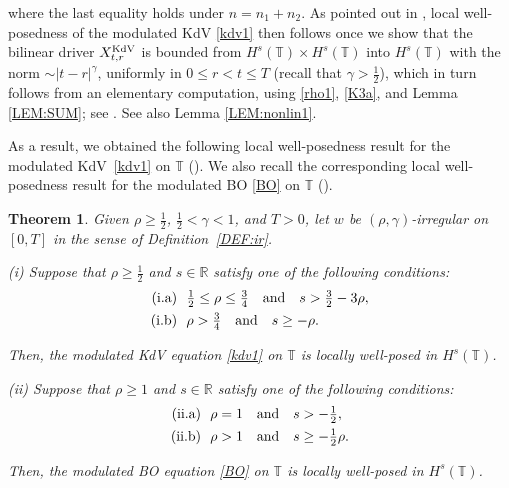 \documentclass[letterpaper, 11pt,  reqno]{amsart}
\newtheorem{oldtheorem}{Theorem}
\newcommand{\1}{\hspace{0.5mm}\text{I}\hspace{0.5mm}}
\newcommand{\noi}{\noindent}
\newcommand{\R}{\mathbb{R}}
\newcommand{\T}{\mathbb{T}}
\newcommand{\g}{\gamma}
\newcommand{\KDV}{\text{\rm KdV} }
\numberwithin{equation}{section}
\numberwithin{theorem}{section}
\begin{document}
\noi
where the last equality holds under  $n = n_1+ n_2$.
As pointed out in \cite[Section 3]{CGLLO1}, 
local well-posedness of the modulated KdV \eqref{kdv1}
then follows 
once we show that 
the bilinear driver $X^\KDV_{t, r}$ is 
bounded from $H^s(\T) \times
H^s(\T)$ into $H^s(\T)$
with the norm $\sim |t- r|^\g$, 
uniformly in  $0 \le r < t \le T$
(recall that $\g > \frac 12$), 
which in turn follows from 
an elementary computation, 
using \eqref{rho1}, \eqref{K3a}, 
and 
 Lemma \ref{LEM:SUM};
 see
 \cite[Proposition~4.1]{CGLLO1}.
See also Lemma \ref{LEM:nonlin1}.



As a result, we obtained
the following local well-posedness result
for  the modulated KdV~\eqref{kdv1} on $\T$
(\cite[Theorem 1.3\,(i)]{CGLLO1}). 
We also recall the corresponding 
local well-posedness result
for the modulated BO \eqref{BO} on $\T$
(\cite[Theorem 1.11\,(i)]{CGLLO1}). 



\begin{oldtheorem}\label{THM:1}
Given $\rho \ge\frac 12$,  $\frac12< \g < 1$, and $T> 0$, 
let  $w$ be $(\rho,\g)$-irregular on $[0, T]$ in the sense of Definition~\ref{DEF:ir}.

\smallskip

\noi
\textup{(i)}
Suppose that $\rho \ge \frac 12$ and $s\in \R$
satisfy one of the following conditions\textup{:}
\begin{align}
\begin{split}
\textup{(i.a)} &\ \  \tfrac 12 \le \rho \le \tfrac 34 \quad \text{and} \quad 
s > \tfrac 32 - 3 \rho, \\
\textup{(i.b)} &\ \  \rho > \tfrac 34\quad  \text{and} \quad  s \ge - \rho.
\end{split}
\label{nonlin1b}
\end{align}


\noi
Then, the modulated KdV equation \eqref{kdv1}
on  $\T$
is %
locally well-posed in $H^s(\T)$.






\smallskip

\noi
\textup{(ii)}
Suppose that $\rho \ge 1$ and $s\in \R$
satisfy one of the following conditions\textup{:}
\begin{align}
\begin{split}
\textup{(ii.a)} &\ \   \rho =  1 \quad \text{and} \quad s > - \tfrac 12, \\
\textup{(ii.b)} &\ \  \rho >  1 \quad  \text{and} \quad  s \ge - \tfrac 12 \rho.
\end{split}
\label{regBO1}
\end{align}



\noi
Then, the modulated BO equation \eqref{BO}
on  $\T$
is %
locally well-posed in $H^s(\T)$.



\end{oldtheorem}
\end{document}
